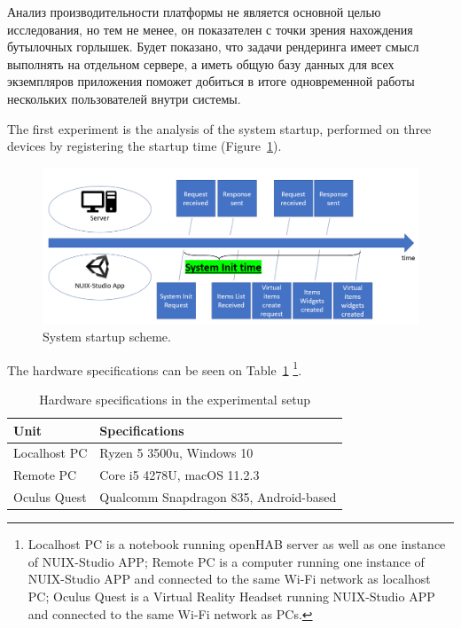 Анализ производительности платформы не является основной целью исследования, но тем не менее, он показателен с точки зрения нахождения бутылочных горлышек. Будет показано, что задачи рендеринга имеет смысл выполнять на отдельном сервере, а иметь общую базу данных для всех экземпляров приложения поможет добиться в итоге одновременной работы нескольких пользователей внутри системы.

The first experiment is the analysis of the system startup, performed on three devices by registering the startup time (Figure~\ref{fig:SystemStartupScheme-figure}).

\begin{figure}
  \centering
  \includegraphics[width=0.9\linewidth]{figures/SystemStartupScheme.png}
  \caption{System startup scheme.}
  \label{fig:SystemStartupScheme-figure}
\end{figure}

The hardware specifications can be seen on Table~\ref{tab:hardware-specifications-table} \footnote{Localhost PC is a notebook running openHAB server as well as one instance of NUIX-Studio APP; Remote PC is a computer running one instance of NUIX-Studio APP and connected to the same Wi-Fi network as localhost PC; Oculus Quest is a Virtual Reality Headset running NUIX-Studio APP and connected to the same Wi-Fi network as PCs.}.

\begin{table}
  \centering
  \begin{threeparttable}[c]
    \caption{Hardware specifications in the experimental setup}
    \label{tab:hardware-specifications-table}
    \begin{tabular}{ll}
      \toprule
      Unit    &         Specifications                 \\
      \midrule
      Localhost PC & Ryzen 5 3500u, Windows 10 \\
      Remote PC & Core i5 4278U, macOS 11.2.3    \\
      Oculus Quest        & Qualcomm Snapdragon 835, Android-based            \\
      \bottomrule
    \end{tabular}
  \end{threeparttable}
\end{table}

